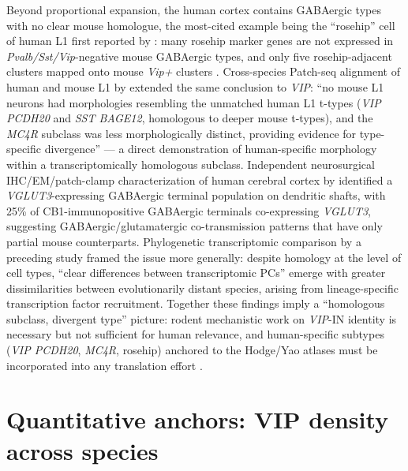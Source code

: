 \documentclass[11pt]{article}
\begin{document}
Beyond proportional expansion, the human cortex contains GABAergic types
with no clear mouse homologue, the most-cited example being the
``rosehip'' cell of human L1 first reported by \citet{Boldog2018}: many
rosehip marker genes are not expressed in \textit{Pvalb/Sst/Vip}-negative mouse
GABAergic types, and only five rosehip-adjacent clusters mapped onto mouse
\textit{Vip+} clusters \citep{Boldog2018}. Cross-species Patch-seq alignment of
human and mouse L1 by \citet{Chartrand2023} extended the same conclusion
to \textit{VIP}: ``no mouse L1 neurons had morphologies resembling the unmatched
human L1 t-types (\textit{VIP PCDH20} and \textit{SST BAGE12}, homologous to deeper
mouse t-types), and the \textit{MC4R} subclass was less morphologically distinct,
providing evidence for type-specific divergence'' --- a direct
demonstration of human-specific morphology within a transcriptomically
homologous subclass. Independent neurosurgical IHC/EM/patch-clamp
characterization of human cerebral cortex by \citet{Somogyi2025}
identified a \textit{VGLUT3}-expressing GABAergic terminal population on
dendritic shafts, with 25\% of CB1-immunopositive GABAergic terminals
co-expressing \textit{VGLUT3}, suggesting GABAergic/glutamatergic
co-transmission patterns that have only partial mouse counterparts.
Phylogenetic transcriptomic comparison by a preceding study framed the
issue more generally: despite homology at the level of cell types, ``clear
differences between transcriptomic PCs'' emerge with greater
dissimilarities between evolutionarily distant species, arising from
lineage-specific transcription factor recruitment. Together these findings
imply a ``homologous subclass, divergent type'' picture: rodent
mechanistic work on \textit{VIP}-IN identity is necessary but not sufficient for
human relevance, and human-specific subtypes (\textit{VIP PCDH20}, \textit{MC4R},
rosehip) anchored to the Hodge/Yao atlases must be incorporated into any
translation effort \citep{Hodge2019, Yao2023, Lee2023a, Chartrand2023, Boldog2018}.

\section{Quantitative anchors: VIP density across species}
\end{document}
